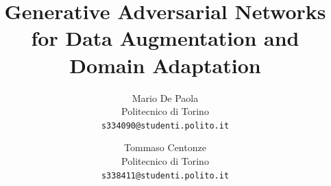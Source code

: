 \documentclass[10pt,twocolumn,letterpaper]{article}
\title{Generative Adversarial Networks for Data Augmentation and Domain Adaptation}
\author{Mario De Paola\\
Politecnico di Torino\\
{\tt\small s334090@studenti.polito.it}
\and
Tommaso Centonze\\
Politecnico di Torino\\
{\tt\small s338411@studenti.polito.it}
}
\begin{document}
\maketitle
    





{
    \small
    
    
}

% 
\end{document}
